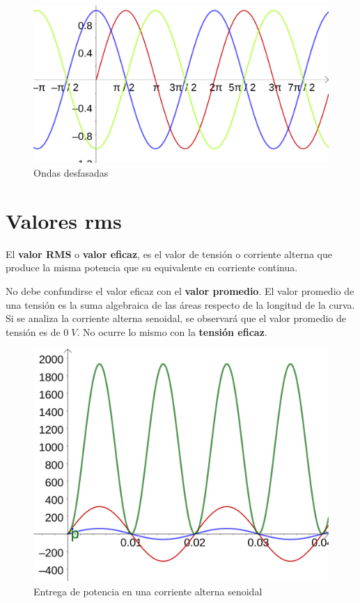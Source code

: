 \begin{figure}[htbp]
  \includegraphics[scale=0.14]{images/ejemplos_senos}
  \caption{Ondas desfasadas}
  \label{fig:ejemplos_senos}
\end{figure}

\section{Valores rms}
El \textbf{valor RMS} o \textbf{valor eficaz}, es el valor de tensión o corriente alterna que produce la misma potencia que su equivalente en corriente continua.

No debe confundirse el valor eficaz con el \textbf{valor promedio}. El valor promedio de una tensión es la suma algebraica de las áreas respecto de la longitud de la curva. Si se analiza la corriente alterna senoidal, se observará que el valor promedio de tensión es de $0\; V$. No ocurre lo mismo con la \textbf{tensión eficaz}.

\begin{figure}[htbp]
  \includegraphics[scale=0.14]{images/potencia_alterna}
  \caption{Entrega de potencia en una corriente alterna senoidal}
  \label{fig:potencia_alterna}
\end{figure}

